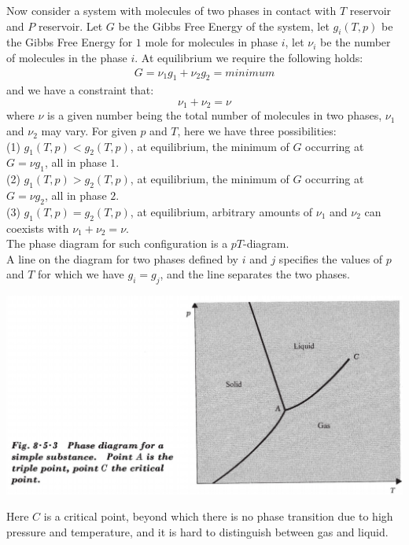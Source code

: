 \documentclass[11pt,oneside]{book}
\theoremstyle{break}
\theoremstyle{break}
\begin{document}
\hfill\break\hfill\break
Now consider a system with molecules of two phases in contact with $T$ reservoir and $P$ reservoir. Let $G$ be the Gibbs Free Energy of the system, let $g_i(T,p)$ be the Gibbs Free Energy for $1$ mole for molecules in phase $i$, let $\nu_i$ be the number of molecules in the phase $i$. At equilibrium we require the following holds:
\begin{align*}
G = \nu_1 g_1 + \nu_2 g_2 = minimum
\end{align*}
and we have a constraint that: 
$$\nu_1 + \nu_2 = \nu$$
where $\nu$ is a given number being the total number of molecules in two phases, $\nu_1$ and $\nu_2$ may vary. For given $p$ and $T$, here we have three possibilities:\\
(1) $g_1(T,p) < g_2(T,p)$, at equilibrium, the minimum of $G$ occurring at $G = \nu g_1$, all in phase $1$.\\
(2) $g_1(T,p) > g_2(T,p)$, at equilibrium, the minimum of $G$ occurring at $G = \nu g_2$, all in phase $2$.\\
(3) $g_1(T,p) = g_2(T,p)$, at equilibrium, arbitrary amounts of $\nu_1$ and $\nu_2$ can coexists with $\nu_1 + \nu_2 = \nu$.\\

The phase diagram for such configuration is a $pT$-diagram. \\
A line on the diagram for two phases defined by $i$ and $j$ specifies the values of $p$ and $T$ for which we have $g_i = g_j$, and the line separates the two phases. 
\begin{center}
\includegraphics[scale=0.35]{phaseDiagm.png}
\end{center}
Here $C$ is a critical point, beyond which there is no phase transition due to high pressure and temperature, and it is hard to distinguish between gas and liquid.\\
\end{document}

